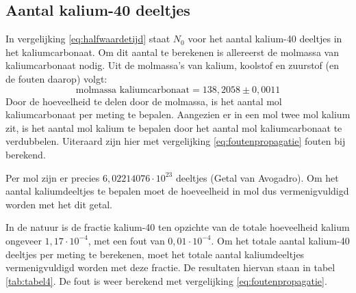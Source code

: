\documentclass[11pt,a4paper]{article}
\begin{document}
\begin{table}
\caption{Gemeten activiteit van verschillende hoeveelheden . De fouten op de counts worden gegeven door de wortel van het aantal counts zelf.}
\centering
{}
\label{tab:tabel3}
\end{table}

\subsection{Aantal kalium-40 deeltjes}
In vergelijking \ref{eq:halfwaardetijd} staat $N_0$ voor het aantal kalium-40 deeltjes in het kaliumcarbonaat. Om dit aantal te berekenen is allereerst de molmassa van kaliumcarbonaat nodig. Uit de molmassa's van kalium, koolstof en zuurstof (en de fouten daarop) volgt:
\begin{equation}
\text{molmassa kaliumcarbonaat} = 138,2058 \pm 0,0011
\label{eq:molmassa_kacarb}
\end{equation}
Door de hoeveelheid  te delen door de molmassa, is het aantal mol kaliumcarbonaat per meting te bepalen. Aangezien er in een mol  twee mol kalium zit, is het aantal mol kalium te bepalen door het aantal mol kaliumcarbonaat te verdubbelen. Uiteraard zijn hier met vergelijking \ref{eq:foutenpropagatie} fouten bij berekend.

Per mol zijn er precies $6,02214076 \cdot 10^{23}$ deeltjes (Getal van Avogadro). Om het aantal kaliumdeeltjes te bepalen moet de hoeveelheid in mol dus vermenigvuldigd worden met het dit getal.

In de natuur is de fractie kalium-40 ten opzichte van de totale hoeveelheid kalium ongeveer $1,17 \cdot 10^{-4}$, met een fout van 
$0,01 \cdot 10^{-4}$. Om het totale aantal kalium-40 deeltjes per meting te berekenen, moet het totale aantal kaliumdeeltjes vermenigvuldigd worden met deze fractie. De resultaten hiervan staan in tabel \ref{tab:tabel4}. De fout is weer berekend met vergelijking \ref{eq:foutenpropagatie}.
\end{document}
